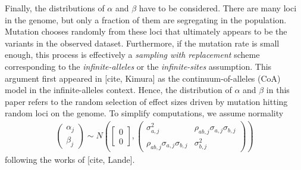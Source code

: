Finally, the distributions of $\alpha$ and $\beta$ have to be considered.
There are many loci in the genome, but only a fraction of them are segregating in the population.
Mutation chooses randomly from these loci that ultimately appears to be the variants in the observed dataset.
Furthermore, if the mutation rate is small enough, this process is effectively a \emph{sampling with replacement} scheme corresponding to the \emph{infinite-alleles} or the \emph{infinite-sites} assumption.
This argument first appeared in [cite, Kimura] as the continuum-of-alleles (CoA) model in the infinite-alleles context.
Hence, the distribution of $\alpha$ and $\beta$ in this paper refers to the random selection of effect sizes driven by mutation hitting random loci on the genome.
To simplify computations,
we assume normality
\begin{gather} \label{eq:coa}
\begin{pmatrix}
        \alpha_j \\
        \beta_j
    \end{pmatrix}
    \sim
    N\left(
    \begin{bmatrix}
        0 \\
        0
    \end{bmatrix}
    , 
    \begin{pmatrix}
        \sigma_{a,j}^2 & \rho_{ab,j}\sigma_{a,j}\sigma_{b,j} \\
        \rho_{ab,j} \sigma_{a,j} \sigma_{b,j} & \sigma_{b,j}^2
    \end{pmatrix} 
    \right)
\end{gather}
following the works of [cite, Lande].







